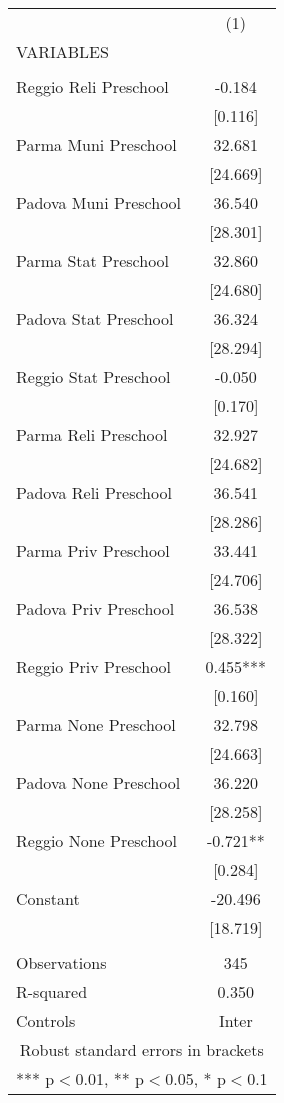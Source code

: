 \begin{tabular}{lc} \hline
 & (1) \\
VARIABLES &  \\ \hline
 &  \\
Reggio Reli Preschool & -0.184 \\
 & [0.116] \\
Parma Muni Preschool & 32.681 \\
 & [24.669] \\
Padova Muni Preschool & 36.540 \\
 & [28.301] \\
Parma Stat Preschool & 32.860 \\
 & [24.680] \\
Padova Stat Preschool & 36.324 \\
 & [28.294] \\
Reggio Stat Preschool & -0.050 \\
 & [0.170] \\
Parma Reli Preschool & 32.927 \\
 & [24.682] \\
Padova Reli Preschool & 36.541 \\
 & [28.286] \\
Parma Priv Preschool & 33.441 \\
 & [24.706] \\
Padova Priv Preschool & 36.538 \\
 & [28.322] \\
Reggio Priv Preschool & 0.455*** \\
 & [0.160] \\
Parma None Preschool & 32.798 \\
 & [24.663] \\
Padova None Preschool & 36.220 \\
 & [28.258] \\
Reggio None Preschool & -0.721** \\
 & [0.284] \\
Constant & -20.496 \\
 & [18.719] \\
 &  \\
Observations & 345 \\
R-squared & 0.350 \\
 Controls & Inter \\ \hline
\multicolumn{2}{c}{ Robust standard errors in brackets} \\
\multicolumn{2}{c}{ *** p$<$0.01, ** p$<$0.05, * p$<$0.1} \\
\end{tabular}
